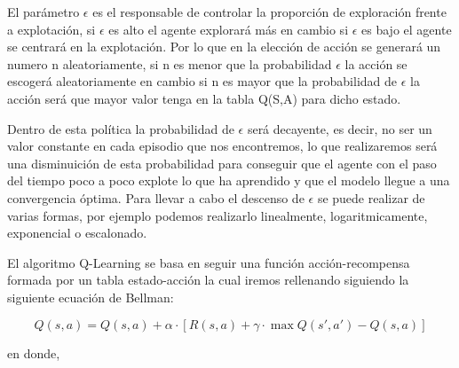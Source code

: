 \begin{itemize}
 El parámetro $\epsilon$ es el responsable de controlar la proporción de exploración frente a explotación, si $\epsilon$  es alto el agente explorará más en cambio si $\epsilon$ es bajo
 el agente se centrará en la explotación. Por lo que en la elección de acción se generará un numero n aleatoriamente, si n es menor que la probabilidad $\epsilon$ la acción se escogerá aleatoriamente
 en cambio si n es mayor que la probabilidad de $\epsilon$ la acción será que mayor valor tenga en la tabla Q(S,A) para dicho estado. \newline
 
 Dentro de esta política la probabilidad de $\epsilon$ será decayente, es decir, no ser un valor constante en cada episodio que nos encontremos, lo que realizaremos será una disminuición 
 de esta probabilidad para conseguir que el agente con el paso del tiempo poco a poco explote lo que ha aprendido y que el modelo llegue a una convergencia óptima. Para llevar a cabo el descenso
 de $\epsilon$ se puede realizar de varias formas, por ejemplo podemos realizarlo linealmente, logaritmicamente, exponencial o escalonado. \newline
  \end{itemize}

  El algoritmo Q-Learning  se basa en seguir una función acción-recompensa formada por un tabla estado-acción la cual iremos rellenando siguiendo la siguiente ecuación
  de Bellman\cite{Bellman}:
  
  \begin{equation} 
    Q(s, a) = Q(s, a) + \alpha \cdot [R(s, a) + \gamma \cdot \max Q(s', a') - Q(s, a)]
  \end{equation} 

  en donde, 

